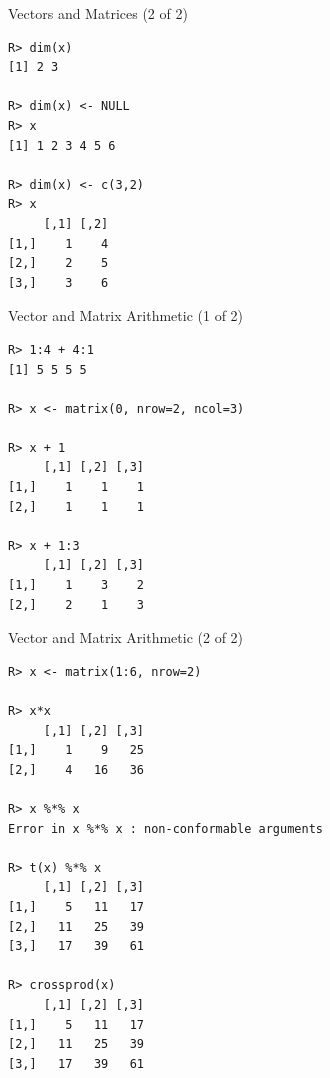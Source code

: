 \begin{frame}[fragile]
  \begin{exampleblock}{Vectors and Matrices (2 of 2)}\pause
  \begin{lstlisting}[backgroundcolor=\color{white},basicstyle=\ttfamily\color{dkgray}\scriptsize,keywordstyle=\color{black}, 
  commentstyle=\color{orange},stringstyle=\color{mauve}]
R> dim(x)
[1] 2 3

R> dim(x) <- NULL
R> x
[1] 1 2 3 4 5 6

R> dim(x) <- c(3,2)
R> x
     [,1] [,2]
[1,]    1    4
[2,]    2    5
[3,]    3    6
\end{lstlisting}
  \end{exampleblock}
\end{frame}


\begin{frame}[fragile]
  \begin{exampleblock}{Vector and Matrix Arithmetic (1 of 2)}\pause
  \begin{lstlisting}[backgroundcolor=\color{white},basicstyle=\ttfamily\color{dkgray}\scriptsize,keywordstyle=\color{black}, 
  commentstyle=\color{orange},stringstyle=\color{mauve}]
R> 1:4 + 4:1
[1] 5 5 5 5

R> x <- matrix(0, nrow=2, ncol=3)

R> x + 1
     [,1] [,2] [,3]
[1,]    1    1    1
[2,]    1    1    1

R> x + 1:3
     [,1] [,2] [,3]
[1,]    1    3    2
[2,]    2    1    3

\end{lstlisting}
  \end{exampleblock}
\end{frame}



\begin{frame}
  \begin{exampleblock}{Vector and Matrix Arithmetic (2 of 2)}\pause
  \begin{lstlisting}[backgroundcolor=\color{white},basicstyle=\ttfamily\color{dkgray}\scriptsize,keywordstyle=\color{black}, 
  commentstyle=\color{orange},stringstyle=\color{mauve}]
R> x <- matrix(1:6, nrow=2)

R> x*x
     [,1] [,2] [,3]
[1,]    1    9   25
[2,]    4   16   36

R> x %*% x
Error in x %*% x : non-conformable arguments

R> t(x) %*% x
     [,1] [,2] [,3]
[1,]    5   11   17
[2,]   11   25   39
[3,]   17   39   61

R> crossprod(x)
     [,1] [,2] [,3]
[1,]    5   11   17
[2,]   11   25   39
[3,]   17   39   61
\end{lstlisting}
  \end{exampleblock}
\end{frame}

